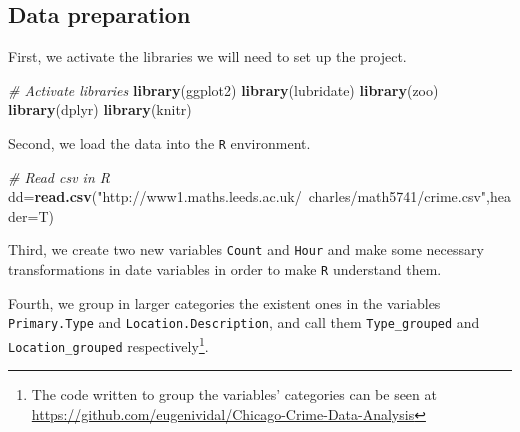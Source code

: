 \documentclass[]{article}
\newenvironment{Shaded}{\begin{snugshade}}{\end{snugshade}}
\newcommand{\KeywordTok}[1]{\textcolor[rgb]{0.13,0.29,0.53}{\textbf{{#1}}}}
\newcommand{\DataTypeTok}[1]{\textcolor[rgb]{0.13,0.29,0.53}{{#1}}}
\newcommand{\DecValTok}[1]{\textcolor[rgb]{0.00,0.00,0.81}{{#1}}}
\newcommand{\StringTok}[1]{\textcolor[rgb]{0.31,0.60,0.02}{{#1}}}
\newcommand{\CommentTok}[1]{\textcolor[rgb]{0.56,0.35,0.01}{\textit{{#1}}}}
\newcommand{\NormalTok}[1]{{#1}}
\let\rmarkdownfootnote\footnote%
\def\footnote{\protect\rmarkdownfootnote}
\begin{document}
\subsection{Data preparation}\label{data-preparation}

First, we activate the libraries we will need to set up the project.

\begin{Shaded}
\begin{Highlighting}[]
\CommentTok{# Activate libraries}
\KeywordTok{library}\NormalTok{(ggplot2)}
\KeywordTok{library}\NormalTok{(lubridate)}
\KeywordTok{library}\NormalTok{(zoo)}
\KeywordTok{library}\NormalTok{(dplyr)}
\KeywordTok{library}\NormalTok{(knitr)}
\end{Highlighting}
\end{Shaded}

Second, we load the data into the \texttt{R} environment.

\begin{Shaded}
\begin{Highlighting}[]
\CommentTok{# Read csv in R}
\NormalTok{dd=}\KeywordTok{read.csv}\NormalTok{(}\StringTok{"http://www1.maths.leeds.ac.uk/~charles/math5741/crime.csv"}\NormalTok{,}\DataTypeTok{header=}\NormalTok{T)}
\end{Highlighting}
\end{Shaded}

\pagebreak

Third, we create two new variables \texttt{Count} and \texttt{Hour} and
make some necessary transformations in date variables in order to make
\texttt{R} understand them.

\begin{Shaded}
\end{Shaded}

Fourth, we group in larger categories the existent ones in the variables
\texttt{Primary.Type} and \texttt{Location.Description}, and call them
\texttt{Type\_grouped} and \texttt{Location\_grouped}
respectively\footnote{The code written to group the variables'
  categories can be seen at
  \url{https://github.com/eugenividal/Chicago-Crime-Data-Analysis}}.
\end{document}
